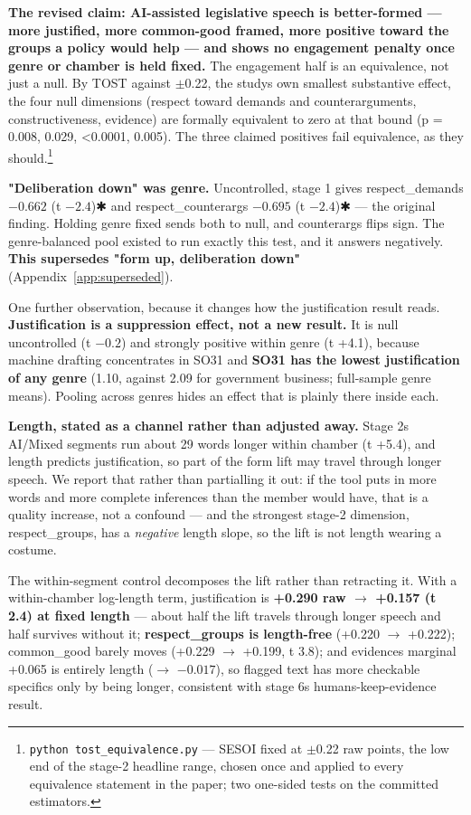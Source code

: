 \textbf{The revised claim: AI-assisted legislative speech is better-formed --- more
justified, more common-good framed, more positive toward the groups a policy
would help --- and shows no engagement penalty once genre or chamber is held
fixed.} The engagement half is an equivalence, not just a null. By TOST
against \(\pm\)0.22, the study\textquotesingle s own smallest substantive effect, the four null
dimensions (respect toward demands and counterarguments, constructiveness,
evidence) are formally equivalent to zero at that bound (p = 0.008, 0.029,
\textless0.0001, 0.005). The three claimed positives fail equivalence, as they
should.\footnote{\texttt{python\ tost\_\allowbreak{}equivalence.\allowbreak{}py} --- SESOI fixed at \(\pm\)0.22 raw points,
  the low end of the stage-2 headline range, chosen once and applied to
  every equivalence statement in the paper; two one-sided tests on the
  committed estimators.}

\textbf{"Deliberation down" was genre.} Uncontrolled, stage 1 gives respect\_demands
\(-0.662\) (t \(-2.4\))✱ and respect\_counterargs \(-0.695\) (t \(-2.4\))✱ --- the original
finding. Holding genre fixed sends both to null, and counterargs flips sign.
The genre-balanced pool existed to run exactly this test, and it answers
negatively. \textbf{This supersedes "form up, deliberation down"} (Appendix~\ref{app:superseded}).

One further observation, because it changes how the justification result
reads. \textbf{Justification is a suppression effect, not a new result.} It is null
uncontrolled (t \(-0.2\)) and strongly positive within genre (t +4.1), because
machine drafting concentrates in SO31 and \textbf{SO31 has the lowest justification
of any genre} (1.10, against 2.09 for government business; full-sample genre
means). Pooling across genres hides an effect that is plainly there inside
each.

\textbf{Length, stated as a channel rather than adjusted away.}
Stage 2\textquotesingle s AI/Mixed segments run about 29 words longer within chamber
(t +5.4), and length predicts justification, so part of the form lift may
travel through longer speech. We report that rather than partialling it out: if the
tool puts in more words and more complete inferences than the member would
have, that is a quality increase, not a confound --- and the strongest stage-2
dimension, respect\_groups, has a \emph{negative} length slope, so the lift is not
length wearing a costume.

The within-segment control decomposes the lift rather than retracting it. With
a within-chamber log-length term, justification is \textbf{+0.290 raw \(\rightarrow\) +0.157 (t 2.4)
at fixed length} --- about half the lift travels through longer speech and half
survives without it; \textbf{respect\_groups is length-free} (+0.220 \(\rightarrow\) +0.222);
common\_good barely moves (+0.229 \(\rightarrow\) +0.199, t 3.8); and evidence\textquotesingle s marginal
+0.065 is entirely length (\(\rightarrow\) \(-0.017\)), so flagged text has more checkable
specifics only by being longer, consistent with stage 6\textquotesingle s
humans-keep-evidence result.


